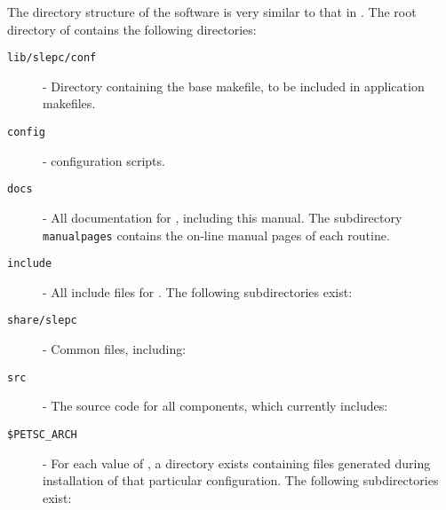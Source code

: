 	The directory structure of the \slepc software is very similar to that in \petsc. The root directory of \slepc contains the following directories:
\begin{description}
\item[\texttt{lib/slepc/conf}] - Directory containing the base \slepc makefile, to be included in application makefiles.
\item[\texttt{config}] - \slepc configuration scripts.
\item[\texttt{docs}] - All documentation for \slepc, including this manual. The subdirectory \texttt{manualpages} contains the on-line manual pages of each \slepc routine.
\item[\texttt{include}] - All include files for \slepc. The following subdirectories exist:
\item[\texttt{share/slepc}] - Common files, including:
\item[\texttt{src}] - The source code for all \slepc components, which currently includes:
\item[\texttt{\$PETSC\_ARCH}] - For each value of , a directory exists containing files generated during installation of that particular configuration. The following subdirectories exist:
\end{description}
